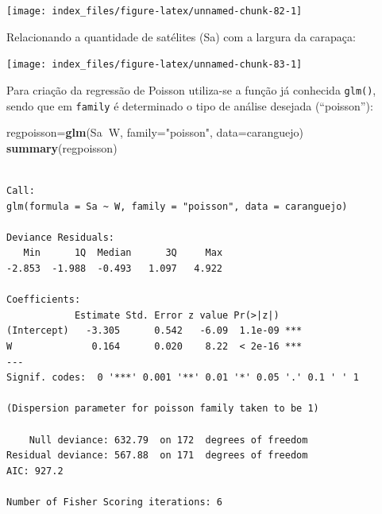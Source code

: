 \documentclass[12pt,brazil,oneside]{book}
\newenvironment{Shaded}{\begin{snugshade}}{\end{snugshade}}
\newcommand{\DataTypeTok}[1]{\textcolor[rgb]{0.13,0.29,0.53}{#1}}
\newcommand{\KeywordTok}[1]{\textcolor[rgb]{0.13,0.29,0.53}{\textbf{#1}}}
\newcommand{\NormalTok}[1]{#1}
\newcommand{\OperatorTok}[1]{\textcolor[rgb]{0.81,0.36,0.00}{\textbf{#1}}}
\newcommand{\StringTok}[1]{\textcolor[rgb]{0.31,0.60,0.02}{#1}}
\begin{document}
\begin{center}\texttt{[image: index\_files/figure-latex/unnamed-chunk-82-1]} \end{center}

Relacionando a quantidade de satélites (Sa) com a largura da carapaça:

\begin{Shaded}
\end{Shaded}

\begin{center}\texttt{[image: index\_files/figure-latex/unnamed-chunk-83-1]} \end{center}

Para criação da regressão de Poisson utiliza-se a função já conhecida
\texttt{glm()}, sendo que em \texttt{family} é determinado o tipo de
análise desejada (``poisson''):

\begin{Shaded}
\begin{Highlighting}[]
\NormalTok{regpoisson=}\KeywordTok{glm}\NormalTok{(Sa}\OperatorTok{~}\NormalTok{W, }\DataTypeTok{family=}\StringTok{"poisson"}\NormalTok{, }\DataTypeTok{data=}\NormalTok{caranguejo)}
\KeywordTok{summary}\NormalTok{(regpoisson)}
\end{Highlighting}
\end{Shaded}

\begin{verbatim}

Call:
glm(formula = Sa ~ W, family = "poisson", data = caranguejo)

Deviance Residuals: 
   Min      1Q  Median      3Q     Max  
-2.853  -1.988  -0.493   1.097   4.922  

Coefficients:
            Estimate Std. Error z value Pr(>|z|)    
(Intercept)   -3.305      0.542   -6.09  1.1e-09 ***
W              0.164      0.020    8.22  < 2e-16 ***
---
Signif. codes:  0 '***' 0.001 '**' 0.01 '*' 0.05 '.' 0.1 ' ' 1

(Dispersion parameter for poisson family taken to be 1)

    Null deviance: 632.79  on 172  degrees of freedom
Residual deviance: 567.88  on 171  degrees of freedom
AIC: 927.2

Number of Fisher Scoring iterations: 6
\end{verbatim}
\end{document}
